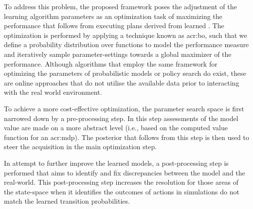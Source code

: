 To address this problem, the proposed framework poses the adjustment of the learning algorithm parameters as an optimization task of maximizing the performance that follows from executing plans derived from learned .
The optimization is performed by applying a technique known as \acrfull{acr:bo}, such that we define a probability distribution over functions to model the performance measure and iteratively sample parameter-settings towards a global maximizer of the performance.
Although algorithms that employ the same framework for optimizing the parameters of probabilistic models \cite{ghavamzadeh2015bayesian, guez2012efficient} or policy search \cite{deisenroth2011pilco, wilson2014using} do exist, these are online approaches that do not utilise the available data prior to interacting with the real world environment.


To achieve a more cost-effective optimization, the parameter search space is first narrowed down by a pre-processing step.
In this step assessments of the model value are made on a more abstract level (i.e., based on the computed value function for an \acrshort{acr:mdp}).
The posterior that follows from this step is then used to steer the acquisition in the main optimization step.

In attempt to further improve the learned models, a post-processing step is performed that aims to identify and fix discrepancies between the model and the real-world.
This post-processing step increases the resolution for those areas of the state-space when it identifies the outcomes of actions in simulations do not match the learned transition probabilities.

